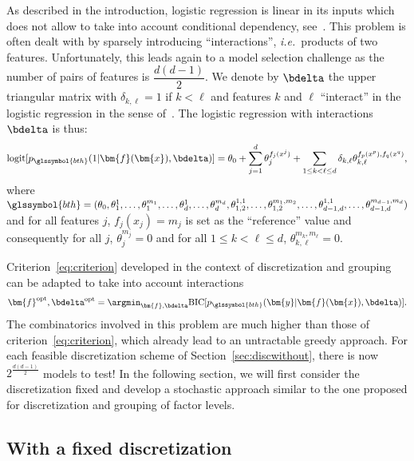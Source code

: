 As described in the introduction, logistic regression is linear in its inputs which does not allow to take into account conditional dependency, see~\cite{berry2010testing}. This problem is often dealt with by sparsely introducing ``interactions'', \textit{i.e.}\ products of two features. Unfortunately, this leads again to a model selection challenge as the number of pairs of features is $\dfrac{d(d-1)}{2}$. We denote by $\bdelta$ the upper triangular matrix with $\delta_{k,\ell} = 1$ if $k < \ell$ and features $k$ and $\ell$ ``interact'' in the logistic regression in the sense of~\cite{berry2010testing}. The logistic regression with interactions $\bdelta$ is thus:
\begin{equation} \label{eq:reglog_sans}
\text{logit}[p_{\glssymbol{bth}}(1|\bm{f}(\bm{x}),\bdelta)] = \theta_{0} + \sum_{j=1}^d \theta_{j}^{f_j(x^j)} + \sum_{1 \leq k < \ell \leq d} \delta_{k,\ell} \theta_{k,\ell}^{f_p(x^p),f_q(x^q)},
\end{equation}
where $\glssymbol{bth} = (\theta_{0},\theta_{1}^1,\dots,\theta_{1}^{m_1},\dots,\theta_{d}^1,\dots,\theta_{d}^{m_d},\theta_{1,2}^{1,1},\dots,\theta_{1,2}^{m_1,m_2},\dots,\theta_{d-1,d}^{1,1},\dots,\theta_{d-1,d}^{m_{d-1},m_d})$ and for all features $j$, $f_j(x_j)=m_j$ is set as the ``reference'' value and consequently for all $j$, $\theta_{j}^{m_j}=0$ and for all $1 \leq k < \ell \leq d$, $\theta_{k,\ell}^{m_k,m_{\ell}}=0$.

Criterion~\eqref{eq:criterion} developed in the context of discretization and grouping can be adapted to take into account interactions
\begin{equation}\label{eq:criterion_inter}
\bm{f}^{\text{opt}},\bdelta^{\text{opt}} = \argmin_{\bm{f},\bdelta} \text{BIC}[p_{\glssymbol{bth}}(\bm{y}|\bm{f}(\bm{x}),\bdelta)].
\end{equation}
The combinatorics involved in this problem are much higher than those of criterion~\eqref{eq:criterion}, which already lead to an untractable greedy approach. For each feasible discretization scheme of Section~\ref{sec:discwithout}, there is now $2^{\frac{d(d-1)}{2}}$ models to test! In the following section, we will first consider the discretization fixed and develop a stochastic approach similar to the one proposed for discretization and grouping of factor levels.

\subsection{With a fixed discretization}

